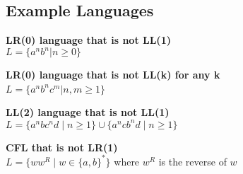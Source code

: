 
\begin{samepage}
\section{Example Languages}
\textbf{LR(0) language that is not LL(1)}\\
    $L = \{a^n b^n | n \geq 0\}$

\textbf{LR(0) language that is not LL(k) for any k}\\
$L = \{a^n b^n c^m | n, m \geq 1\} $\

\textbf{LL(2) language that is not LL(1)}\\
$L = \{ a^n b c^n d \mid n \geq 1 \} \cup \{ a^n c b^n d \mid n \geq 1 \}$

\textbf{CFL that is not LR(1)}\\
$ L = \{ w w^R \mid w \in \{a, b\}^* \} $ where $ w^R $ is the reverse of $ w $

\end{samepage}

